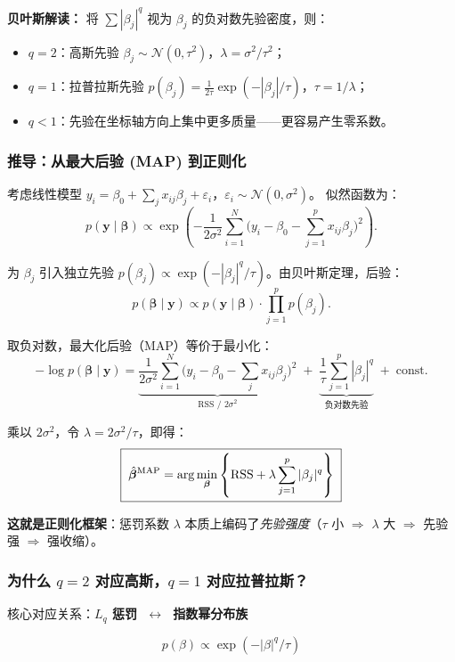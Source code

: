 \textbf{贝叶斯解读：} 将 $\sum |\beta_j|^q$ 视为 $\beta_j$ 的负对数先验密度，则：
\begin{itemize}
    \item $q=2$：高斯先验 $\beta_j \sim \mathcal{N}(0, \tau^2)$，$\lambda = \sigma^2/\tau^2$；
    \item $q=1$：拉普拉斯先验 $p(\beta_j) = \frac{1}{2\tau}\exp(-|\beta_j|/\tau)$，$\tau = 1/\lambda$；
    \item $q<1$：先验在坐标轴方向上集中更多质量——更容易产生零系数。
\end{itemize}

\subsubsection{推导：从最大后验 (MAP) 到正则化}

考虑线性模型 $y_i = \beta_0 + \sum_j x_{ij}\beta_j + \varepsilon_i$，$\varepsilon_i \sim \mathcal{N}(0, \sigma^2)$。
似然函数为：
\[
p(\mathbf{y} \mid \bm{\beta}) \propto \exp\!\left(-\frac{1}{2\sigma^2}\sum_{i=1}^{N}\big(y_i - \beta_0 - \sum_{j=1}^{p} x_{ij}\beta_j\big)^2\right).
\]

为 $\beta_j$ 引入独立先验 $p(\beta_j) \propto \exp(-|\beta_j|^q / \tau)$。由贝叶斯定理，后验：
\[
p(\bm{\beta} \mid \mathbf{y}) \propto p(\mathbf{y} \mid \bm{\beta}) \cdot \prod_{j=1}^{p} p(\beta_j).
\]

取负对数，最大化后验（MAP）等价于最小化：
\[
-\log p(\bm{\beta} \mid \mathbf{y})
= \underbrace{\frac{1}{2\sigma^2}\sum_{i=1}^{N}\big(y_i - \beta_0 - \sum_{j} x_{ij}\beta_j\big)^2}_{\text{RSS / } 2\sigma^2}
\;+\; \underbrace{\frac{1}{\tau}\sum_{j=1}^{p} |\beta_j|^q}_{\text{负对数先验}}
\;+\; \text{const}.
\]

乘以 $2\sigma^2$，令 $\lambda = 2\sigma^2 / \tau$，即得：
\[
\boxed{\;\hat{\bm{\beta}}^{\text{MAP}} = \arg\min_{\bm{\beta}} \left\{
\text{RSS} + \lambda \sum_{j=1}^{p} |\beta_j|^q
\right\}\;}
\]

\textbf{这就是正则化框架}：惩罚系数 $\lambda$ 本质上编码了\emph{先验强度}（$\tau$ 小 $\Rightarrow$ $\lambda$ 大 $\Rightarrow$ 先验强 $\Rightarrow$ 强收缩）。

\subsubsection{为什么 $q=2$ 对应高斯，$q=1$ 对应拉普拉斯？}

核心对应关系：\textbf{$L_q$ 惩罚 $\; \leftrightarrow\;$ 指数幂分布族}

\[
p(\beta) \propto \exp(-|\beta|^q / \tau)
\]

